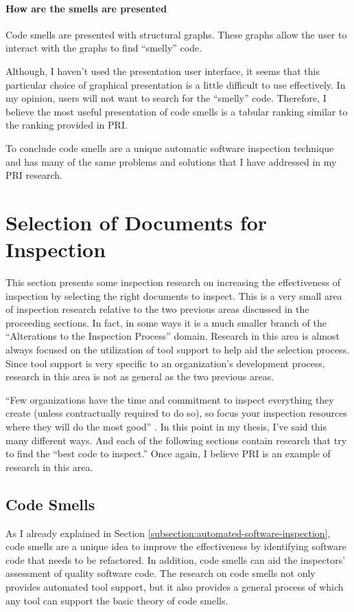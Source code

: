 \paragraph{How are the smells are presented}
Code smells are presented with structural graphs. These graphs allow the
user to interact with the graphs to find ``smelly'' code. 

Although, I haven't used the presentation user interface, it seems that
this particular choice of graphical presentation is a little difficult to
use effectively. In my opinion, users will not want to search for the
``smelly'' code. Therefore, I believe the most useful presentation of code
smells is a tabular ranking similar to the ranking provided in
PRI. \newline

\indent To conclude code smells are a unique automatic software inspection
technique and has many of the same problems and solutions that I have
addressed in my PRI research.




\section{Selection of Documents for Inspection}
This section presents some inspection research on increasing the
effectiveness of inspection by selecting the right documents to inspect.
This is a very small area of inspection research relative to the two
previous areas discussed in the proceeding sections. In fact, in some ways
it is a much smaller branch of the ``Alterations to the Inspection
Process'' domain. Research in this area is almost always focused on the
utilization of tool support to help aid the selection process. Since tool
support is very specific to an organization's development process, research
in this area is not as general as the two previous areas.

``Few organizations have the time and commitment to inspect everything they
create (unless contractually required to do so), so focus your inspection
resources where they will do the most good'' \cite{Wiegers02}. In this
point in my thesis, I've said this many different ways. And each of the
following sections contain research that try to find the ``best code to
inspect.'' Once again, I believe PRI is an example of research in this
area. 


\subsection{Code Smells}
As I already explained in Section
\ref{subsection:automated-software-inspection}, code smells are a unique
idea to improve the effectiveness by identifying software code that needs
to be refactored. In addition, code smells can aid the inspectors'
assessment of quality software code. The research on code smells not only
provides automated tool support, but it also provides a general process of
which any tool can support the basic theory of code smells.

